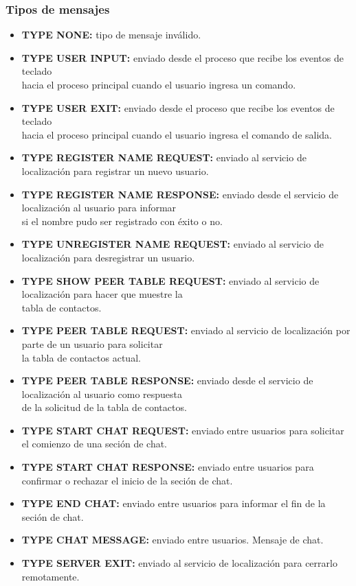 \subsubsection{Tipos de mensajes}
\begin{itemize}
  \item {\bf TYPE NONE:} tipo de mensaje inválido.
  \item {\bf TYPE USER INPUT:} enviado desde el proceso que recibe los eventos de teclado \\
hacia el proceso principal cuando el usuario ingresa un comando.
  \item {\bf TYPE USER EXIT:} enviado desde el proceso que recibe los eventos de teclado \\
hacia el proceso principal cuando el usuario ingresa el comando de salida.
  \item {\bf TYPE REGISTER NAME REQUEST:} enviado al servicio de localización para registrar un nuevo usuario.
  \item {\bf TYPE REGISTER NAME RESPONSE:} enviado desde el servicio de localización al usuario para informar \\
si el nombre pudo ser registrado con éxito o no.
  \item {\bf TYPE UNREGISTER NAME REQUEST:} enviado al servicio de localización para desregistrar un usuario.
  \item {\bf TYPE SHOW PEER TABLE REQUEST:} enviado al servicio de localización para hacer que muestre la \\
tabla de contactos.
  \item {\bf TYPE PEER TABLE REQUEST:} enviado al servicio de localización por parte de un usuario para solicitar \\
la tabla de contactos actual.
  \item {\bf TYPE PEER TABLE RESPONSE:} enviado desde el servicio de localización al usuario como respuesta \\
de la solicitud de la tabla de contactos. 
  \item {\bf TYPE START CHAT REQUEST:} enviado entre usuarios para solicitar el comienzo de una seción de chat.
  \item {\bf TYPE START CHAT RESPONSE:} enviado entre usuarios para confirmar o rechazar el inicio de la seción de chat.
  \item {\bf TYPE END CHAT:} enviado entre usuarios para informar el fin de la seción de chat.
  \item {\bf TYPE CHAT MESSAGE:} enviado entre usuarios. Mensaje de chat.
  \item {\bf TYPE SERVER EXIT:} enviado al servicio de localización para cerrarlo remotamente.
\end{itemize}

